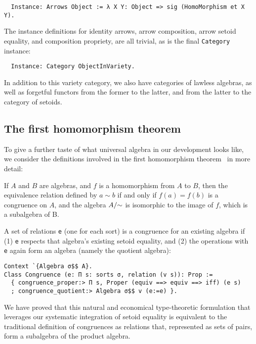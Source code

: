 \documentclass[a4paper,10pt,runningheads]{llncs}
\begin{document}
\begin{lstlisting}
  Instance: Arrows Object := λ X Y: Object => sig (HomoMorphism et X Y).
\end{lstlisting}

The instance definitions for identity arrows, arrow composition, arrow setoid equality, and composition propriety, are all trivial, as is the final \lstinline|Category| instance:
\begin{lstlisting}
  Instance: Category ObjectInVariety.
\end{lstlisting}

In addition to this variety category, we also have categories of lawless algebras, as well as forgetful functors from the former to the latter, and from the latter to the category of setoids.

\subsection{The first homomorphism theorem}
\label{homothm}

To give a further taste of what universal algebra in our development looks like, we consider the definitions involved in the first homomorphism theorem~\cite{meinke1993universal} in more detail:
\begin{theorem}
If $A$ and $B$ are algebras, and $f$ is a homomorphism from $A$ to $B$, then the equivalence relation defined by $a\sim b$ if and only if $f(a)=f(b)$ is a congruence on $A$, and the algebra $A/\hspace{-1mm}\sim$ is isomorphic to the image of $f$, which is a subalgebra of B.
\end{theorem}

A set of relations \lstinline|e| (one for each sort) is a congruence for an existing algebra if (1) \lstinline|e| respects that algebra's existing setoid equality, and (2) the operations with \lstinline|e| again form an algebra (namely the quotient algebra):
\begin{lstlisting}
Context `{Algebra σ$$ A}.
Class Congruence (e: Π s: sorts σ, relation (v s)): Prop :=
  { congruence_proper:> Π s, Proper (equiv ==> equiv ==> iff) (e s)
  ; congruence_quotient:> Algebra σ$$ v (e:=e) }.
\end{lstlisting}
We have proved that this natural and economical type-theoretic formulation that leverages our systematic integration of setoid equality is equivalent to the traditional definition of congruences as relations that, represented as sets of pairs, form a subalgebra of the product algebra.
\end{document}
